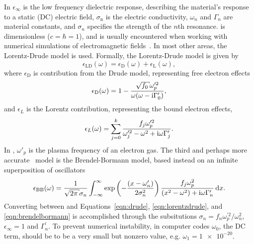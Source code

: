 In  $\epsilon_\infty$ is the low frequency
dielectric response, describing the material's response to a static (DC)
electric field, $\sigma_\mathrm{n}$ is the electric conductivity,
$\omega_n$ and $\Gamma_n$ are material constants, and $\sigma_n$ specifies
the strength of the $n$th resonance.   is
dimensionless ($c=\hbar=1$), and is usually encountered when working with
numerical simulations of electromagnetic fields~\cite{oskooi2010meep}.  In
most other areas, the Lorentz-Drude model is used.  Formally, the
Lorentz-Drude model is given by
\begin{equation}
\epsilon_\mathrm{LD}(\omega)=\epsilon_\mathrm{D}(\omega)+\epsilon_\mathrm{L}(\omega),
\end{equation}
where $\epsilon_\mathrm{D}$ is contribution from the Drude model, representing
free electron effects
\begin{align}
\epsilon_\mathrm{D}(\omega)=1-\frac{\sqrt{f_0} \omega_p^{\prime 2}}{\omega(\omega -
\mi\Gamma_0^\prime)},
\label{eqn:drude}
\end{align}
and $\epsilon_L$ is the Lorentz contribution, representing the bound
electron effects,
\begin{align}
\epsilon_L(\omega) =\sum_{j=0}^{k}\frac{f_j\omega_p^{\prime 2}}{\omega_j^{\prime
2}-\omega^2+{\mathrm{i}}\omega\Gamma_j^\prime}.
\label{eqn:lorentzdrude}
\end{align}
In , $\omega'_p$ is the plasma frequency of an
electron gas.  The third and perhaps more
accurate~\cite{jahanshahi2014study} model is the
Brendel-Bormann model, based instead on an infinite superposition
of oscillators
\begin{align}
\epsilon_\text{BB}(\omega) = \frac{1}{\sqrt{2 \pi} \sigma_n} \intinfty
\exp\left(-\frac{(x-\omega'_n)}{2 \sigma_n^2}\right)
\frac{f_j \omega_p^2}{(x^2-\omega^2)+\mi \omega \Gamma'_n} \md x.
\label{eqn:brendelbormann}
\end{align}
Converting between  and
Equations~\ref{eqn:drude}, \ref{eqn:lorentzdrude}, and
\ref{eqn:brendelbormann} is accomplished through the subsitutions $\sigma_n
= {f_n \omega_p^{\prime 2}}/{\omega_n^2}$, $\epsilon_\infty=1$ and
$\Gamma_n^\prime$.  To prevent numerical instability, in computer codes
$\omega_0$, the DC term, should be to be a very small but nonzero value,
e.g.  $\omega_1 = \num{1e-20}$. 

